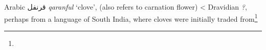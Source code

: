 \begin{etymology}\label{ety:qaranful}
Arabic {قرنفل} \textit{qaranful} `clove', (also refers to carnation flower)
< Dravidian \textit{?}, perhaps from a language of South India, where cloves were initially traded from\footnote{}
\end{etymology}